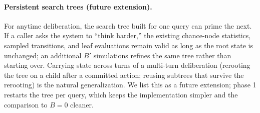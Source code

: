 \paragraph{Persistent search trees (future extension).}
For anytime deliberation, the search tree built for one query can
prime the next. If a caller asks the system to ``think harder,'' the
existing chance-node statistics, sampled transitions, and leaf
evaluations remain valid as long as the root state is unchanged; an
additional $B'$ simulations refines the same tree rather than starting
over. Carrying state across turns of a multi-turn deliberation
(rerooting the tree on a child after a committed action; reusing
subtrees that survive the rerooting) is the natural generalization.
We list this as a future extension; phase 1 restarts the tree per
query, which keeps the implementation simpler and the comparison to
$B = 0$ cleaner.
